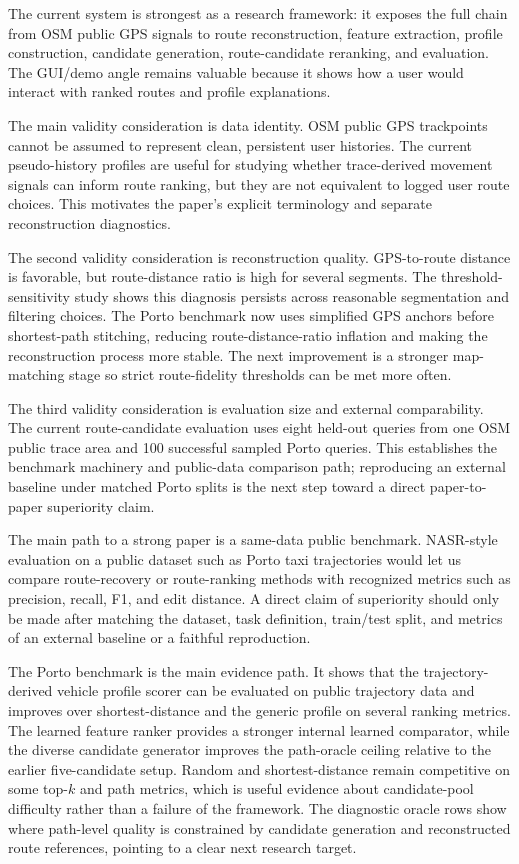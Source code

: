 The current system is strongest as a research framework: it exposes the full chain from OSM public GPS signals to route reconstruction, feature extraction, profile construction, candidate generation, route-candidate reranking, and evaluation. The GUI/demo angle remains valuable because it shows how a user would interact with ranked routes and profile explanations.

The main validity consideration is data identity. OSM public GPS trackpoints cannot be assumed to represent clean, persistent user histories. The current pseudo-history profiles are useful for studying whether trace-derived movement signals can inform route ranking, but they are not equivalent to logged user route choices. This motivates the paper's explicit terminology and separate reconstruction diagnostics.

The second validity consideration is reconstruction quality. GPS-to-route distance is favorable, but route-distance ratio is high for several segments. The threshold-sensitivity study shows this diagnosis persists across reasonable segmentation and filtering choices. The Porto benchmark now uses simplified GPS anchors before shortest-path stitching, reducing route-distance-ratio inflation and making the reconstruction process more stable. The next improvement is a stronger map-matching stage so strict route-fidelity thresholds can be met more often.

The third validity consideration is evaluation size and external comparability. The current route-candidate evaluation uses eight held-out queries from one OSM public trace area and 100 successful sampled Porto queries. This establishes the benchmark machinery and public-data comparison path; reproducing an external baseline under matched Porto splits is the next step toward a direct paper-to-paper superiority claim.

The main path to a strong paper is a same-data public benchmark. NASR-style evaluation on a public dataset such as Porto taxi trajectories would let us compare route-recovery or route-ranking methods with recognized metrics such as precision, recall, F1, and edit distance. A direct claim of superiority should only be made after matching the dataset, task definition, train/test split, and metrics of an external baseline or a faithful reproduction.

The Porto benchmark is the main evidence path. It shows that the trajectory-derived vehicle profile scorer can be evaluated on public trajectory data and improves over shortest-distance and the generic profile on several ranking metrics. The learned feature ranker provides a stronger internal learned comparator, while the diverse candidate generator improves the path-oracle ceiling relative to the earlier five-candidate setup. Random and shortest-distance remain competitive on some top-$k$ and path metrics, which is useful evidence about candidate-pool difficulty rather than a failure of the framework. The diagnostic oracle rows show where path-level quality is constrained by candidate generation and reconstructed route references, pointing to a clear next research target.

